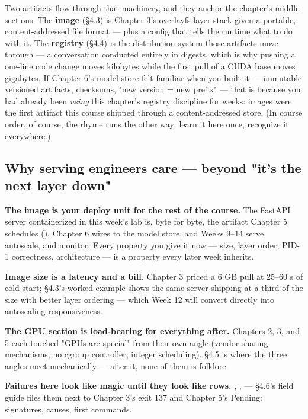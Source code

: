 Two artifacts flow through that machinery, and they anchor the chapter's middle sections. The \textbf{image} (§4.3) is Chapter 3's overlayfs layer stack given a portable, content-addressed file format — plus a config that tells the runtime what to do with it. The \textbf{registry} (§4.4) is the distribution system those artifacts move through — a conversation conducted entirely in digests, which is why pushing a one-line code change moves kilobytes while the first pull of a CUDA base moves gigabytes. If Chapter 6's model store felt familiar when you built it — immutable versioned artifacts, checksums, "new version = new prefix" — that is because you had already been \textit{using} this chapter's registry discipline for weeks: images were the first artifact this course shipped through a content-addressed store. (In course order, of course, the rhyme runs the other way: learn it here once, recognize it everywhere.)

\subsection*{Why serving engineers care — beyond "it's the next layer down"}

\begin{tbbitemize}
  \item \textbf{The image is your deploy unit for the rest of the course.} The FastAPI server containerized in this week's lab is, byte for byte, the artifact Chapter 5 schedules (), Chapter 6 wires to the model store, and Weeks 9–14 serve, autoscale, and monitor. Every property you give it now — size, layer order, PID-1 correctness, architecture — is a property every later week inherits.
  \item \textbf{Image size is a latency and a bill.} Chapter 3 priced a 6 GB pull at 25–60 s of cold start; §4.3's worked example shows the same server shipping at a third of the size with better layer ordering — which Week 12 will convert directly into autoscaling responsiveness.
  \item \textbf{The GPU section is load-bearing for everything after.} Chapters 2, 3, and 5 each touched "GPUs are special" from their own angle (vendor sharing mechanisms; no cgroup controller; integer scheduling). §4.5 is where the three angles meet mechanically — after it, none of them is folklore.
  \item \textbf{Failures here look like magic until they look like rows.} , ,  — §4.6's field guide files them next to Chapter 3's exit 137 and Chapter 5's Pending: signatures, causes, first commands.
\end{tbbitemize}

